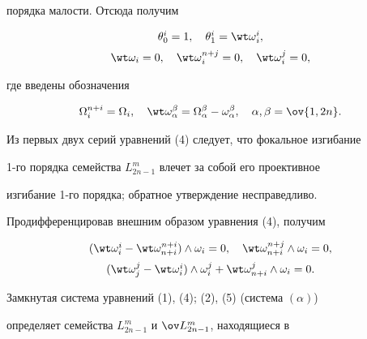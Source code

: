 порядка малости. Отсюда получим 


\begin{equation} 


\begin{array}{c} 


\theta^i_0=1,\quad \theta^i_1=\wt\omega{}^i_i,\\[2mm] 


\wt\omega_i=0,\quad \wt\omega{}^{n+j}_i=0,\quad\wt\omega{}^j_i=0, 


\end{array} 


\end{equation} 


где введены обозначения 


$$ 


\Omega^{n+i}_i=\Omega_i,\quad \wt\omega^\beta_\alpha= 


\Omega^\beta_\alpha-\omega^\beta_\alpha,\quad \alpha,\beta=\ov{1,2n}. 


$$ 


 


Из первых двух серий уравнений (4) следует, что фокальное изгибание 


1-го порядка семейства $L^m_{2n-1}$ влечет за собой его проективное 


изгибание 1-го порядка; обратное утверждение несправедливо. 


Продифференцировав внешним образом уравнения (4), получим 


\begin{equation} 


\begin{array}{c} 


(\wt\omega^i_i-\wt\omega^{n+i}_{n+i})\wedge\omega_i=0,\quad 


\wt\omega^{n+j}_{n+i}\wedge\omega_i=0,\\[2mm] 


(\wt\omega^j_j-\wt\omega^i_i)\wedge\omega^j_i+ 


\wt\omega^j_{n+i}\wedge\omega_i=0. 


\end{array} 


\end{equation} 


Замкнутая система уравнений (1), (4); (2), (5) (система $(\alpha)$) 


определяет семейства $L^m_{2n-1}$ и $\ov L{}^m_{2n-1}$, находящиеся в 



